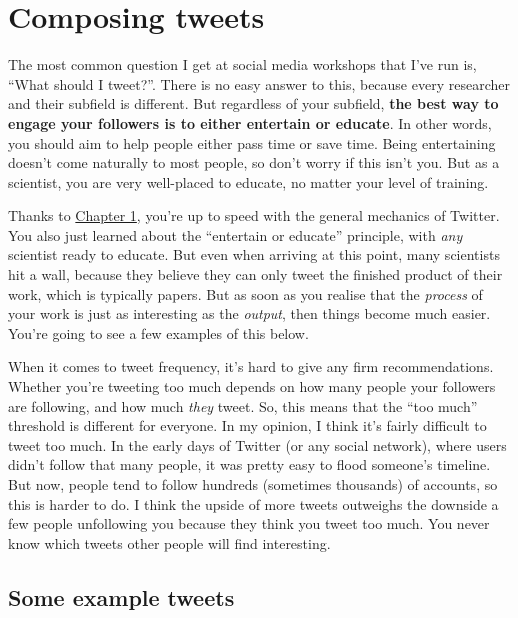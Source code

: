 \documentclass[
]{book}
\begin{document}
\hypertarget{composing}{%
\chapter{Composing tweets}\label{composing}}

The most common question I get at social media workshops that I've run is, ``What should I tweet?''. There is no easy answer to this, because every researcher and their subfield is different. But regardless of your subfield, \textbf{the best way to engage your followers is to either entertain or educate}. In other words, you should aim to help people either pass time or save time. Being entertaining doesn't come naturally to most people, so don't worry if this isn't you. But as a scientist, you are very well-placed to educate, no matter your level of training.

Thanks to \protect\hyperlink{beginner}{Chapter 1}, you're up to speed with the general mechanics of Twitter. You also just learned about the ``entertain or educate'' principle, with \emph{any} scientist ready to educate. But even when arriving at this point, many scientists hit a wall, because they believe they can only tweet the finished product of their work, which is typically papers. But as soon as you realise that the \emph{process} of your work is just as interesting as the \emph{output}, then things become much easier. You're going to see a few examples of this below.

When it comes to tweet frequency, it's hard to give any firm recommendations. Whether you're tweeting too much depends on how many people your followers are following, and how much \emph{they} tweet. So, this means that the ``too much'' threshold is different for everyone. In my opinion, I think it's fairly difficult to tweet too much. In the early days of Twitter (or any social network), where users didn't follow that many people, it was pretty easy to flood someone's timeline. But now, people tend to follow hundreds (sometimes thousands) of accounts, so this is harder to do. I think the upside of more tweets outweighs the downside a few people unfollowing you because they think you tweet too much. You never know which tweets other people will find interesting.

\hypertarget{some-example-tweets}{%
\section*{Some example tweets}\label{some-example-tweets}}
\end{document}
